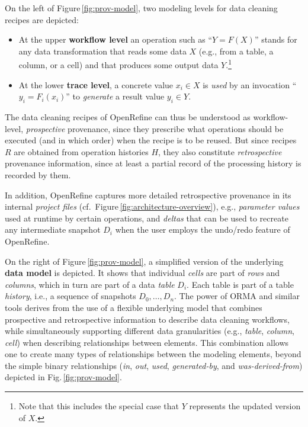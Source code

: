 \documentclass[conference]{ijdc-v14}
\newcommand{\Figref}[1]{Figure\,\ref{#1}}
\newcommand{\figref}[1]{Fig.\,\ref{#1}}
\newcommand{\orma}{\textsf{ORMA}\xspace}  %
\newcommand{\openrefine}{\textrm{OpenRefine}\xspace}
\begin{document}
On the left of \Figref{fig:prov-model}, two modeling levels for data cleaning recipes are depicted:

\begin{itemize}
\item At the upper \textbf{workflow level} an operation such as ``$Y=F(X)$'' stands for any data
transformation that reads some data $X$ (e.g., from a table, a column, or a cell) and that produces
some output data $Y$.\footnote{Note that this includes the special case that $Y$ represents the
  updated version of $X$.} 
\item 
At the lower \textbf{trace level}, a concrete value $x_i\in X$ is \emph{used} by an invocation
``$y_i=F_i(x_i)$'' to \emph{generate} a result value $y_i\in Y$. 
\end{itemize}

The data cleaning recipes of \openrefine can thus be understood as workflow-level,
\emph{prospective} provenance, since they prescribe what operations should be executed (and in which
order) when the recipe is to be reused. But since recipes $R$ are obtained from operation histories
$H$, they also constitute \emph{retrospective} provenance information, since at least a partial
record of the processing history is recorded by them. 

In addition, \openrefine captures more detailed retrospective provenance in its internal
\emph{project files} (cf.\ \Figref{fig:architecture-overview}), e.g., \emph{parameter values} used
at runtime by certain operations, and \emph{deltas} that can be used to recreate any intermediate
snapshot $D_i$ when the user employs the undo/redo feature of \openrefine.

On the right of \Figref{fig:prov-model}, a simplified version of the underlying \textbf{data model} is
depicted. It shows that individual \emph{cells} are part of \emph{rows} and \emph{columns}, which in turn are part of a
data \emph{table} $D_i$. Each table is part of a table \emph{history}, i.e., a sequence of snapshots
$D_0,\dots, D_n$.
%
The power of \orma and similar tools derives from the use of a flexible underlying model that
combines prospective and retrospective information to describe data cleaning workflows, while
simultaneously supporting different data granularities (e.g., \emph{table}, \emph{column},
\emph{cell}) when describing relationships between elements. This combination allows one to create
many types of relationships between the modeling elements, beyond the simple binary relationships
(\emph{in}, \emph{out}, \emph{used}, \emph{generated-by}, and \emph{was-derived-from})
depicted in \figref{fig:prov-model}.
\end{document}
